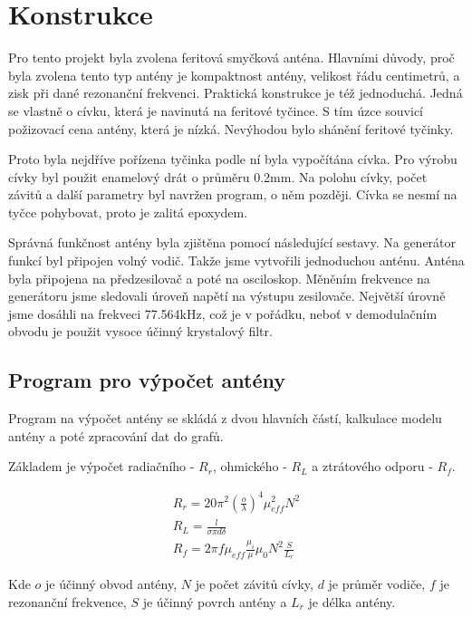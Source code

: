 \newpage

\section{Konstrukce}

Pro tento projekt byla zvolena feritová smyčková anténa. Hlavními důvody, proč byla
zvolena tento typ antény je kompaktnost antény, velikost řádu centimetrů, a zisk při dané
rezonanční frekvenci. Praktická konstrukce je též jednoduchá. Jedná se vlastně o cívku,
která je navinutá na feritové tyčince. S tím úzce souvicí požizovací cena antény, která je
nízká. Nevýhodou bylo shánění feritové tyčinky.

Proto byla nejdříve pořízena tyčinka podle ní byla vypočítána cívka. Pro výrobu cívky byl
použit enamelový drát o průměru 0.2mm. Na polohu cívky, počet závitů a další parametry
byl navržen program, o něm později. Cívka se nesmí na tyčce pohybovat, proto je zalitá
epoxydem.

Správná funkčnost antény byla zjištěna pomocí následující sestavy. Na generátor funkcí byl připojen volný vodič. Takže jsme vytvořili
jednoduchou anténu. Anténa byla připojena na předzesilovač a poté na osciloskop. Měněním
frekvence na generátoru jsme sledovali úroveň napětí na výstupu zesilovače. Největší
úrovně jsme dosáhli na frekveci 77.564kHz, což je v pořádku, neboť v
demodulačním obvodu je použit vysoce účinný krystalový filtr.

\subsection{Program pro výpočet antény}

Program na výpočet antény se skládá z dvou hlavních částí, kalkulace modelu antény a poté
zpracování dat do grafů.

Základem je výpočet radiačního - $R_r$, ohmického - $R_L$ a ztrátového odporu - $R_f$.

\begin{equation}
    \begin{gathered}
        R_r = 20\pi^2\left(\frac{o}{\lambda}\right)^4 \mu_{eff}^2 N^2 \\
        R_L = \frac{l}{\sigma\pi d \delta} \\
        R_f = 2 \pi f \mu_{eff} \frac{\mu_i}{\mu} \mu_0 N^2 \frac{S}{L_r}
    \end{gathered}
\end{equation}

Kde $o$ je účinný obvod antény, $N$ je počet závitů cívky, $d$ je průměr vodiče, $f$ je
rezonanční frekvence, $S$ je účinný povrch antény a $L_r$ je délka antény.

